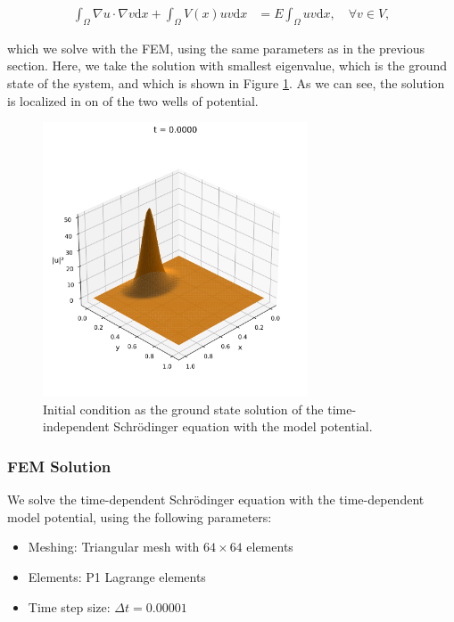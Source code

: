 \documentclass{article}
\theoremstyle{definition}
\theoremstyle{plain}
\theoremstyle{remark}
\begin{document}
\begin{align*}
  \int_{\Omega} \nabla u \cdot \nabla v \mathrm{d}x + \int_{\Omega} V(x) u v \mathrm{d}x &= E \int_{\Omega} u v \mathrm{d}x, \quad \forall v \in V,
\end{align*}

which we solve with the FEM, using the same parameters as in the previous section. Here, we take the solution with smallest eigenvalue, which is the ground state of the system, and which is shown in Figure \ref{fig:initial_state_with_potential}. As we can see, the solution is localized in on of the two wells of potential.

\begin{figure}[h]
  \centering
  \includegraphics[width=0.7\textwidth, trim=0cm 0cm 0cm 1cm, clip]{figures/potential_initial_state_3d.png}
  \caption{Initial condition as the ground state solution of the time-independent Schrödinger equation with the model potential.}
  \label{fig:initial_state_with_potential}
\end{figure}

\subsubsection*{FEM Solution}

We solve the time-dependent Schrödinger equation with the time-dependent model potential, using the following parameters:

\begin{itemize}
  \item Meshing: Triangular mesh with $64 \times 64$ elements
  \item Elements: P1 Lagrange elements
  \item Time step size: $\Delta t = 0.00001$
\end{itemize}
\end{document}
